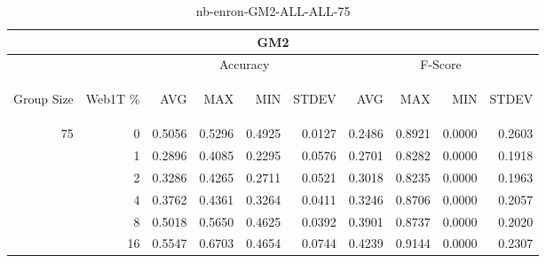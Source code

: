 \begin{center}
\begin{table}[htbp]
\begin{tabular}{ | r | r | r | r | r | r | r | r | r | r |}
\hline
\multicolumn{10}{|c|}{GM2}\\
\hline
 & & \multicolumn{4}{|c|}{Accuracy} & \multicolumn{4}{|c|}{F-Score}\\ \cline{3-10}
\begin{sideways}Group Size\end{sideways} & \begin{sideways}Web1T \%\end{sideways} & \begin{sideways}AVG\end{sideways} & \begin{sideways}MAX\end{sideways} & \begin{sideways}MIN\end{sideways} & \begin{sideways}STDEV\end{sideways} & \begin{sideways}AVG\end{sideways} & \begin{sideways}MAX\end{sideways} & \begin{sideways}MIN\end{sideways} & \begin{sideways}STDEV\end{sideways}\\
\hline
\multirow{6}{*}{75}
 & 0 & 0.5056 & 0.5296 & 0.4925 & 0.0127 & 0.2486 & 0.8921 & 0.0000 & 0.2603\\ \cline{2-10}
 & 1 & 0.2896 & 0.4085 & 0.2295 & 0.0576 & 0.2701 & 0.8282 & 0.0000 & 0.1918\\ \cline{2-10}
 & 2 & 0.3286 & 0.4265 & 0.2711 & 0.0521 & 0.3018 & 0.8235 & 0.0000 & 0.1963\\ \cline{2-10}
 & 4 & 0.3762 & 0.4361 & 0.3264 & 0.0411 & 0.3246 & 0.8706 & 0.0000 & 0.2057\\ \cline{2-10}
 & 8 & 0.5018 & 0.5650 & 0.4625 & 0.0392 & 0.3901 & 0.8737 & 0.0000 & 0.2020\\ \cline{2-10}
 & 16 & 0.5547 & 0.6703 & 0.4654 & 0.0744 & 0.4239 & 0.9144 & 0.0000 & 0.2307\\ \cline{2-10}
\hline
\end{tabular}
\caption{nb-enron-GM2-ALL-ALL-75}
\end{table}
\end{center}

